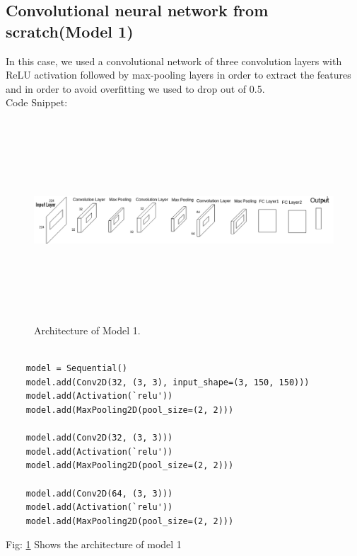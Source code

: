\subsection{Convolutional neural network from scratch(Model 1)}
In this case, we used a convolutional network of three convolution layers with ReLU activation followed by max-pooling layers in order to extract the features and in order to avoid overfitting we used to drop out of 0.5.\\ 
Code Snippet:
\begin{figure}[!htb]
\centerline{\includegraphics[height=75mm,width=162mm]{img/cnn5.png}}
\caption{Architecture of Model 1.}
\label{figcnn}
\end{figure}

\begin{lstlisting}[caption=CNN]

    model = Sequential()
    model.add(Conv2D(32, (3, 3), input_shape=(3, 150, 150)))
    model.add(Activation(`relu'))
    model.add(MaxPooling2D(pool_size=(2, 2)))
    
    model.add(Conv2D(32, (3, 3)))
    model.add(Activation(`relu'))
    model.add(MaxPooling2D(pool_size=(2, 2)))
    
    model.add(Conv2D(64, (3, 3)))
    model.add(Activation(`relu'))
    model.add(MaxPooling2D(pool_size=(2, 2)))
    \end{lstlisting}
    

{\Large Fig:  \ref{figcnn} Shows the architecture of model 1}

